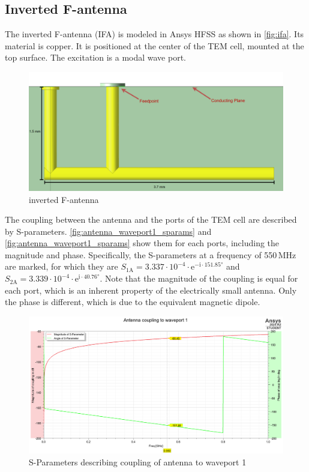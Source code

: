 \subsection{Inverted F-antenna}

The inverted F-antenna (IFA) is modeled in Ansys HFSS as shown in \autoref{fig:ifa}. Its material is copper. It is positioned at the center of the TEM cell, mounted at the top surface. The excitation is a modal wave port.

\begin{figure}[h]
    \centering
    \includegraphics[width=0.7\linewidth]{Documentation//content//30_simulations//img/ifa.png}
    \caption{inverted F-antenna}
    \label{fig:ifa}
\end{figure}

The coupling between the antenna and the ports of the TEM cell are described by S-parameters. \autoref{fig:antenna_waveport1_sparams} and \autoref{fig:antenna_waveport1_sparams} show them for each ports, including the magnitude and phase. Specifically, the S-parameters at a frequency of 550\,MHz are marked, for which they are $S_{1\mathrm{A}}=3.337\cdot10^{-4}\cdot \mathrm{e}^{-\mathrm{i}\cdot151.85°}$ and $S_{2\mathrm{A}}=3.339\cdot10^{-4}\cdot \mathrm{e}^{\mathrm{i}\cdot40.76°}$. Note that the magnitude of the coupling is equal for each port, which is an inherent property of the electrically small antenna. Only the phase is different, which is due to the equivalent magnetic dipole.
 

\begin{figure}[h]
    \centering
    \includegraphics[width=1\linewidth]{Documentation//content//30_simulations//img/antenna_waveport1_sparams.png}
    \caption{S-Parameters describing coupling of antenna to waveport 1}
    \label{fig:antenna_waveport1_sparams}
\end{figure}

